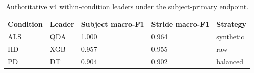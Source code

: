 \begin{table}
\caption{Authoritative v4 within-condition leaders under the subject-primary endpoint.}
\label{tab:step7-within-leaders}
\begin{tabular}{lllll}
\toprule
Condition & Leader & Subject macro-F1 & Stride macro-F1 & Strategy \\
\midrule
ALS & QDA & 1.000 & 0.964 & synthetic \\
HD & XGB & 0.957 & 0.955 & raw \\
PD & DT & 0.904 & 0.902 & balanced \\
\bottomrule
\end{tabular}
\end{table}
